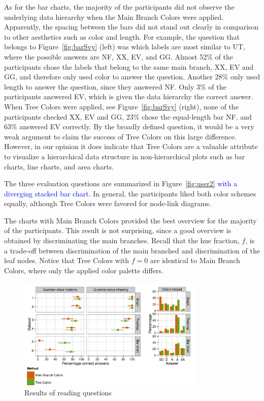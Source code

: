 \documentclass[review,journal]{vgtc}         %
\newcommand{\changedM}[1]{\textcolor{blue}{#1}}
\begin{document}
As for the bar charts, the majority of the participants did not observe the underlying data hierarchy when the Main Branch Colors were applied. Apparently, the spacing between the bars did not stand out clearly in comparison to other aesthetics such as color and length. For example, the question that belongs to Figure~\ref{fig:barSvy} (left) was which labels are most similar to UT, where the possible answers are NF, XX, EV, and GG. Almost 52\% of the participants chose the labels that belong to the same main branch, XX, EV and GG, and therefore only used color to answer the question. Another 28\% only used length to answer the question, since they answered NF. Only 3\% of the participants answered EV, which is given the data hierarchy the correct answer. When Tree Colors were applied, see Figure~\ref{fig:barSvy} (right), none of the participants checked XX, EV and GG, 23\% chose the equal-length bar NF, and 63\% answered EV correctly. By the broadly defined question, it would be a very weak argument to claim the success of Tree Colors on this large difference. However, in our opinion it does indicate that Tree Colors are a valuable attribute to visualize a hierarchical data structure in non-hierarchical plots such as bar charts, line charts, and area charts.

The three evaluation questions are summarized in Figure~\ref{fig:user2} \changedM{with a diverging stacked bar chart.} In general, the participants liked both color schemes equally, although Tree Colors were favored for node-link diagrams.

The charts with Main Branch Colors provided the best overview for the majority of the participants. This result is not surprising, since a good overview is obtained by discriminating the main branches. 
Recall that the hue fraction, $f$, is a trade-off between discrimination of the main branched and discrimination of the leaf nodes. Notice that Tree Colors with $f=0$ are identical to Main Branch Colors, where only the applied color palette differs.

\begin{figure}[tb]
  \centering
	\includegraphics[width=3.5in]{user_study_results_mod2.pdf}
  \caption{Results of reading questions}\label{fig:user1}
\end{figure}
\end{document}
